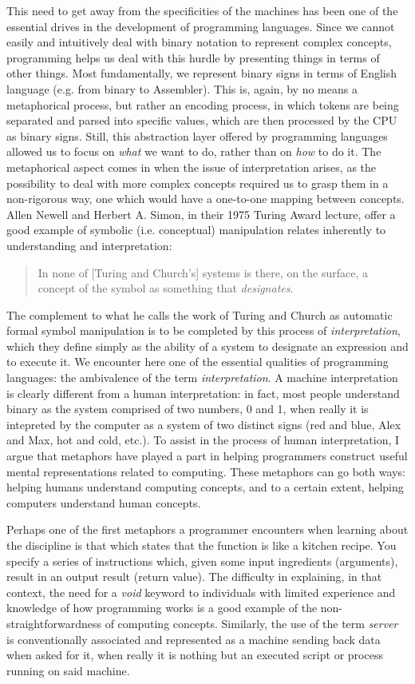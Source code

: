 \documentclass{article}
\begin{document}
This need to get away from the specificities of the machines has been one of the essential drives in the development of programming languages. Since we cannot easily and intuitively deal with binary notation to represent complex concepts, programming helps us deal with this hurdle by presenting things in terms of other things. Most fundamentally, we represent binary signs in terms of English language (e.g. from binary to Assembler). This is, again, by no means a metaphorical process, but rather an encoding process, in which tokens are being separated and parsed into specific values, which are then processed by the CPU as binary signs. Still, this abstraction layer offered by programming languages allowed us to focus on \emph{what} we want to do, rather than on \emph{how} to do it. The metaphorical aspect comes in when the issue of interpretation arises, as the possibility to deal with more complex concepts required us to grasp them in a non-rigorous way, one which would have a one-to-one mapping between concepts. Allen Newell and Herbert A. Simon, in their 1975 Turing Award lecture, offer a good example of symbolic (i.e. conceptual) manipulation relates inherently to understanding and interpretation:

\begin{quote}
  In none of [Turing and Church's] systems is there, on the surface, a concept of the symbol as something that \emph{designates}.
\end{quote}

The complement to what he calls the work of Turing and Church as automatic formal symbol manipulation is to be completed by this process of \emph{interpretation}, which they define simply as the ability of a system to designate an expression and to execute it. We encounter here one of the essential qualities of programming languages: the ambivalence of the term \emph{interpretation}. A machine interpretation is clearly different from a human interpretation: in fact, most people understand binary as the system comprised of two numbers, 0 and 1, when really it is intepreted by the computer as a system of two distinct signs (red and blue, Alex and Max, hot and cold, etc.). To assist in the process of human interpretation, I argue that metaphors have played a part in helping programmers construct useful mental representations related to computing. These metaphors can go both ways: helping humans understand computing concepts, and to a certain extent, helping computers understand human concepts.

Perhaps one of the first metaphors a programmer encounters when learning about the discipline is that which states that the function is like a kitchen recipe. You specify a series of instructions which, given some input ingredients (arguments), result in an output result (return value). The difficulty in explaining, in that context, the need for a \emph{void} keyword to individuals with limited experience and knowledge of how programming works is a good example of the non-straightforwardness of computing concepts. Similarly, the use of the term \emph{server} is conventionally associated and represented as a machine sending back data when asked for it, when really it is nothing but an executed script or process running on said machine.
\end{document}
